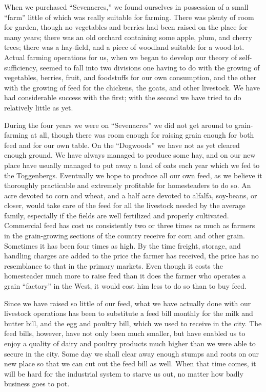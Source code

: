 \documentclass{book}
\begin{document}
When we purchased “Sevenacres,” we found ourselves in possession of a small “farm” little of which was really suitable for farming. There was plenty of room for garden, though no vegetables and berries had been raised on the place for many years; there was an old orchard containing some apple, plum, and cherry trees; there was a hay-field, and a piece of woodland suitable for a wood-lot. Actual farming operations for us, when we began to develop our theory of self-sufficiency, seemed to fall into two divisions one having to do with the growing of vegetables, berries, fruit, and foodstuffs for our own consumption, and the other with the growing of feed for the chickens, the goats, and other livestock. We have had considerable success with the first; with the second we have tried to do relatively little as yet.

During the four years we were on “Sevenacres” we did not get around to grain-farming at all, though there was room enough for raising grain enough for both feed and for our own table. On the “Dogwoods” we have not as yet cleared enough ground. We have always managed to produce some hay, and on our new place have usually managed to put away a load of oats each year which we fed to the Toggenbergs. Eventually we hope to produce all our own feed, as we believe it thoroughly practicable and extremely profitable for homesteaders to do so. An acre devoted to corn and wheat, and a half acre devoted to alfalfa, soy-beans, or closer, would take care of the feed for all the livestock needed by the average family, especially if the fields are well fertilized and properly cultivated. Commercial feed has cost us consistently two or three times as much as farmers in the grain-growing sections of the country receive for corn and other grain. Sometimes it has been four times as high. By the time freight, storage, and handling charges are added to the price the farmer has received, the price has no resemblance to that in the primary markets. Even though it costs the homesteader much more to raise feed than it does the farmer who operates a grain “factory” in the West, it would cost him less to do so than to buy feed.

Since we have raised so little of our feed, what we have actually done with our livestock operations has been to substitute a feed bill monthly for the milk and butter bill, and the egg and poultry bill, which we used to receive in the city. The feed bills, however, have not only been much smaller, but have enabled us to enjoy a quality of dairy and poultry products much higher than we were able to secure in the city. Some day we shall clear away enough stumps and roots on our new place so that we can cut out the feed bill as well. When that time comes, it will be hard for the industrial system to starve us out, no matter how badly business goes to pot.
\end{document}
